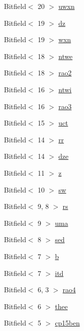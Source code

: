 \begin{DoxyCompactItemize}
\item 
Bitfield$<$ 20 $>$ \hyperlink{namespaceArmISA_a88c3f5b7b5dd8ea214bea94ef86b3d43}{uwxn}
\item 
Bitfield$<$ 19 $>$ \hyperlink{namespaceArmISA_af90fb83a196e395b894bf5c1016a55b7}{dz}
\item 
Bitfield$<$ 19 $>$ \hyperlink{namespaceArmISA_a67833f455e59d521f488e65c1dfe7744}{wxn}
\item 
Bitfield$<$ 18 $>$ \hyperlink{namespaceArmISA_a28daaf334b9ee20d9d4bd995e602fb62}{ntwe}
\item 
Bitfield$<$ 18 $>$ \hyperlink{namespaceArmISA_a341560b73d701014899e7f76c5b62749}{rao2}
\item 
Bitfield$<$ 16 $>$ \hyperlink{namespaceArmISA_a60a0d4f85ea76fe750ca9c40c59f93d0}{ntwi}
\item 
Bitfield$<$ 16 $>$ \hyperlink{namespaceArmISA_a7cf88acccf78f3f625a6f3d2ab691810}{rao3}
\item 
Bitfield$<$ 15 $>$ \hyperlink{namespaceArmISA_aae32c136f916b188731cb885cb33a08d}{uct}
\item 
Bitfield$<$ 14 $>$ \hyperlink{namespaceArmISA_ac64b6be5ecc081277063e5b98851c0cb}{rr}
\item 
Bitfield$<$ 14 $>$ \hyperlink{namespaceArmISA_adbf3c9ab0701fc2e68080e639b83cdde}{dze}
\item 
Bitfield$<$ 11 $>$ \hyperlink{namespaceArmISA_addb4299db91ae95a9c20c36bb082c311}{z}
\item 
Bitfield$<$ 10 $>$ \hyperlink{namespaceArmISA_a91dea4262602b297d130da195e8bbf87}{sw}
\item 
Bitfield$<$ 9, 8 $>$ \hyperlink{namespaceArmISA_acf2b1073855b77fc0cddb61c70ec5391}{rs}
\item 
Bitfield$<$ 9 $>$ \hyperlink{namespaceArmISA_a1e222e118504c03ed1e4d858dc33638e}{uma}
\item 
Bitfield$<$ 8 $>$ \hyperlink{namespaceArmISA_a5f896e12f8fc0dc423a4ec60565c6ad1}{sed}
\item 
Bitfield$<$ 7 $>$ \hyperlink{namespaceArmISA_aa4c45773b9b358324d349233bf954418}{b}
\item 
Bitfield$<$ 7 $>$ \hyperlink{namespaceArmISA_ab897030dd9c1340a42fc02862a57ba7a}{itd}
\item 
Bitfield$<$ 6, 3 $>$ \hyperlink{namespaceArmISA_a7f1bd1e05096bc984347d092f19b19f6}{rao4}
\item 
Bitfield$<$ 6 $>$ \hyperlink{namespaceArmISA_a358faf7ad4258c7dfc7d1570d4c689f7}{thee}
\item 
Bitfield$<$ 5 $>$ \hyperlink{namespaceArmISA_a5f9a6d7b4f8446b9efe375b7c8a12321}{cp15ben}

\end{DoxyCompactItemize}
